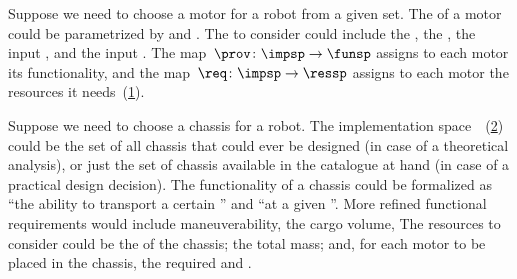 \begin{example}
    \label{exa:motor}
    Suppose we need to choose a motor for a robot from a given set.
    The  of a motor could be parametrized by  and .
    The  to consider could include the \R{\unit[cost]{[USD]}}, the \R{\unit[mass]{[g]}}, the input \R{\unit[voltage]{[V]}}, and the input \R{\unit[current]{[A]}}.
    The map~$\prov \colon \impsp\to\funsp$ assigns to each motor its functionality, and the map~$\req \colon \impsp\rightarrow\ressp$ assigns to each motor the resources it needs~(\cref{fig:motor_evalexec}).
\end{example}

\begin{figure}[h!]
    \centering
    \caption{}
    \label{fig:motor_evalexec}
\end{figure}

\begin{example}
    \label{exa:chassis}
    Suppose we need to choose a chassis for a robot.
    The implementation space~\impsp~(\cref{fig:gmcdp_chassis_eval}) could be the set of all chassis that could ever be designed (in case of a theoretical analysis), or just the set of chassis available in the catalogue at hand (in case of a practical design decision).
    The functionality of a chassis could be formalized as ``the ability to transport a certain '' and ``at a given ''.
    More refined functional requirements would include maneuverability, the cargo volume, \etc
    The resources to consider could be the  of the chassis; the total mass;
    and, for each motor to be placed in the chassis, the required  and .
\end{example}

\begin{figure}[h!]
    \centering
    \caption{}
    \label{fig:gmcdp_chassis_eval}
\end{figure}


